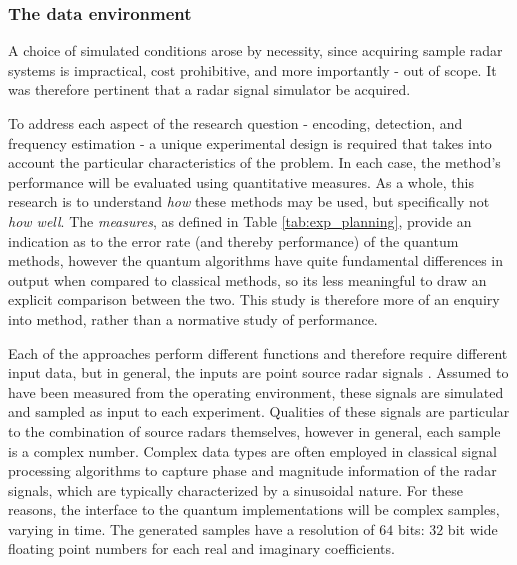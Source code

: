 \subsubsection{The data environment}

A choice of simulated conditions arose by necessity, since acquiring sample radar systems is impractical, cost prohibitive, and more importantly - out of scope.
It was therefore pertinent that a radar signal simulator be acquired.

To address each aspect of the research question - encoding, detection, and frequency estimation - a unique experimental design is required that takes into account the particular characteristics of the problem.
In each case, the method's performance will be evaluated using quantitative measures.
As a whole, this research is to understand \textit{how} these methods may be used, but specifically not \textit{how well}.
The \textit{measures}, as defined in Table \ref{tab:exp_planning}, provide an indication as to the error rate (and thereby performance) of the quantum methods, however the quantum algorithms have quite fundamental differences in output when compared to classical methods, so its less meaningful to draw an explicit comparison between the two.
This study is therefore more of an enquiry into method, rather than a normative study of performance.

Each of the approaches perform different functions and therefore require different input data, but in general, the inputs are point source radar signals \cite{chakravorty_what_2018}.
Assumed to have been measured from the operating environment, these signals are simulated and sampled as input to each experiment.
Qualities of these signals are particular to the combination of source radars themselves, however in general, each sample is a complex number.
Complex data types are often employed in classical signal processing algorithms to capture phase and magnitude information of the radar signals, which are typically characterized by a sinusoidal nature.
For these reasons, the interface to the quantum implementations will be complex samples, varying in time.
The generated samples have a resolution of \(64\) bits: \(32\) bit wide floating point numbers for each real and imaginary coefficients.

